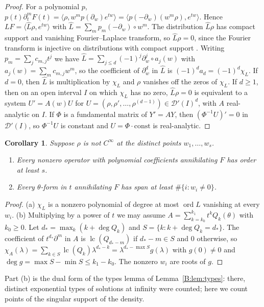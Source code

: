 \documentclass[11pt,a4paper]{article}
\newtheorem{corollary}[theorem]{Corollary}
\theoremstyle{definition}
\theoremstyle{remark}
\DeclareMathOperator{\ord}{ord}
\DeclareMathOperator{\lc}{lc}
\numberwithin{equation}{section}
\begin{document}
\begin{proof}
For a polynomial $p$, $p(t)\partial_t^mF(t)=\langle\rho,w^mp(\partial_w)e^{tw}\rangle=\langle p(-\partial_w)(w^m\rho),e^{tw}\rangle$. Hence $LF=\langle\hat L\rho,e^{tw}\rangle$ with $\hat L=\sum_mp_m(-\partial_w)\circ w^m$. The distribution $\hat L\rho$ has compact support and vanishing Fourier--Laplace transform, so $\hat L\rho=0$, since the Fourier transform is injective on distributions with compact support \cite[\S7.1]{Hor90}. Writing $p_m=\sum_jc_{m,j}t^j$ we have $\hat L=\sum_{j\le d}(-1)^j\partial_w^j\circ a_j(w)$ with $a_j(w)=\sum_mc_{m,j}w^m$, so the coefficient of $\partial_w^d$ in $\hat L$ is $(-1)^da_d=(-1)^d\chi_L$. If $d=0$, then $\hat L$ is multiplication by $\chi_L$ and $\rho$ vanishes off the zeros of $\chi_L$. If $d\ge1$, then on an open interval $I$ on which $\chi_L$ has no zero, $\hat L\rho=0$ is equivalent to a system $U'=A(w)U$ for $U=(\rho,\rho',\dots,\rho^{(d-1)})\in\mathcal D'(I)^d$, with $A$ real-analytic on $I$. If $\Phi$ is a fundamental matrix of $Y'=AY$, then $(\Phi^{-1}U)'=0$ in $\mathcal D'(I)$, so $\Phi^{-1}U$ is constant and $U=\Phi\cdot\mathrm{const}$ is real-analytic.
\end{proof}

\begin{corollary}\label{V:cor:visible}
Suppose $\rho$ is not $C^\infty$ at the distinct points $w_1,\dots,w_s$.
\begin{enumerate}
\item[(a)] Every nonzero operator with polynomial coefficients annihilating $F$ has order at least $s$.
\item[(b)] Every $\theta$-form in $t$ annihilating $F$ has span at least $\#\{i:w_i\ne0\}$.
\end{enumerate}
\end{corollary}

\begin{proof}
(a) $\chi_L$ is a nonzero polynomial of degree at most $\ord L$ vanishing at every $w_i$. (b) Multiplying by a power of $t$ we may assume $A=\sum_{k=k_0}^{k_1}t^kQ_k(\theta)$ with $k_0\ge0$. Let $d_*=\max_k(k+\deg Q_k)$ and $S=\{k:k+\deg Q_k=d_*\}$. The coefficient of $t^{d_*}\partial^m$ in $A$ is $\lc(Q_{d_*-m})$ if $d_*-m\in S$ and $0$ otherwise, so $\chi_A(\lambda)=\sum_{k\in S}\lc(Q_k)\lambda^{d_*-k}=\lambda^{d_*-\max S}g(\lambda)$ with $g(0)\ne0$ and $\deg g=\max S-\min S\le k_1-k_0$. The nonzero $w_i$ are roots of $g$.
\end{proof}

Part (b) is the dual form of the types lemma of Lemma~\ref{B:lem:types}: there, distinct exponential types of solutions at infinity were counted; here we count points of the singular support of the density.
\end{document}
